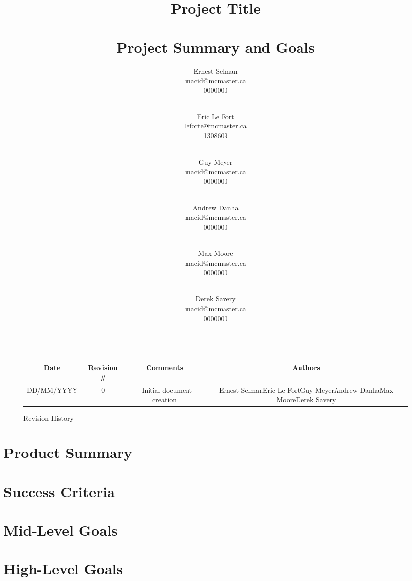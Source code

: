 \documentclass[titlepage]{article}
\title{\textbf{Project Title\\~\\Project Summary and Goals}}
\author{
Ernest Selman\\macid@mcmaster.ca\\0000000\\~\\\and
Eric Le Fort\\leforte@mcmaster.ca\\1308609\\~\\\and
Guy Meyer\\macid@mcmaster.ca\\0000000\\~\\\and
Andrew Danha\\macid@mcmaster.ca\\0000000\\~\\\and
Max Moore\\macid@mcmaster.ca\\0000000\\~\\\and
Derek Savery\\macid@mcmaster.ca\\0000000\\~\\
}
\begin{document}
\maketitle
\newpage
\begin{figure}[!htbp]
\centering
\begin{tabular}{| C{3} | C{2} | C{5} | C{2.22} |}\hline
	Date			&Revision \#	&Comments						&Authors\\\hline
	DD/MM/YYYY		&0				&- Initial document creation	&Ernest Selman\newline Eric Le Fort\newline Guy Meyer\newline Andrew Danha\newline Max Moore\newline Derek Savery\\\hline
\end{tabular}
\caption{Revision History}
\end{figure}

\tableofcontents
\listoffigures
\newpage


\section{Product Summary}
\section{Success Criteria}
\section{Mid-Level Goals}
\section{High-Level Goals}
\end{document}
